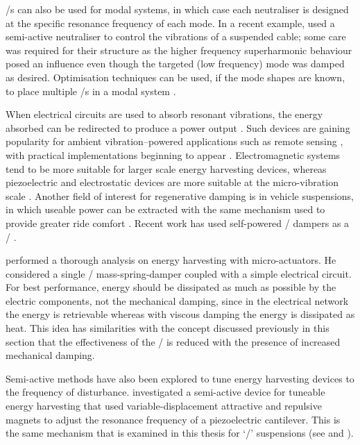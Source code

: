 \documentclass[11pt,a4paper]{memoir}
\begin{document}
\Vibneut/s can also be used for modal systems, in which case each neutraliser is designed at the specific resonance frequency of each mode.
In a recent example, \textcite{casciati2007} used a semi-active neutraliser to control the vibrations of a suspended cable; some care was required for their structure as the higher frequency superharmonic behaviour posed an influence even though the targeted (low frequency) mode was damped as desired.
Optimisation techniques can be used, if the mode shapes are known, to place multiple \vibneut/s in a modal system \cite{petit2009-jva}.

When electrical circuits are used to absorb resonant vibrations, the energy absorbed can be redirected to produce a power output \cite{stephen2006}.
Such devices are gaining popularity for ambient vibration--powered applications such as remote sensing \cite{arnold2007}, with practical implementations beginning to appear \cite{ferrari2009-sms}.
Electromagnetic systems tend to be more suitable for larger scale energy harvesting devices, whereas piezoelectric and electrostatic devices are more suitable at the micro-vibration scale \cite{beeby2009}.
Another field of interest for regenerative damping is in vehicle suspensions, in which useable power can be extracted with the same mechanism used to provide greater ride comfort \cite{graves2000thesis}.
Recent work has used self-powered \magnetorh/ dampers as a \vibneut/ \cite{choi2009-jva}.

\textcite{stephen2006} performed a thorough analysis on energy harvesting with micro-actuators.
He considered a single \dof/ mass-spring-damper coupled with a simple electrical circuit.
For best performance, energy should be dissipated as much as possible by the electric components, not the mechanical damping, since in the electrical network the energy is retrievable whereas with viscous damping the energy is dissipated as heat.
This idea has similarities with the concept discussed previously in this section that the effectiveness of the \vibneut/ is reduced with the presence of increased mechanical damping.

Semi-active methods have also been explored to tune energy harvesting devices to the frequency of disturbance.
\textcite{challa2008} investigated a semi-active device for tuneable energy harvesting that used variable-displacement attractive and repulsive magnets to adjust the resonance frequency of a piezoelectric cantilever.
This is the same mechanism that is examined in this thesis for `\qzs/' suspensions (see  and ).
\end{document}
